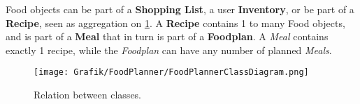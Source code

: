 Food objects can be part of a \textbf{Shopping List}, a user \textbf{Inventory}, or be part of a \textbf{Recipe}, seen as aggregation on \cref{fig:classDiagram}. A \textbf{Recipe} contains 1 to many Food objects, and is part of a \textbf{Meal} that in turn is part of a \textbf{Foodplan}. A \textit{Meal} contains exactly 1 recipe, while the \textit{Foodplan} can have any number of planned \textit{Meals}.

\begin{figure}[H]
	\centering
	\texttt{[image: Grafik/FoodPlanner/FoodPlannerClassDiagram.png]}
	\caption{Relation between classes.}
	\label{fig:classDiagram}
\end{figure}